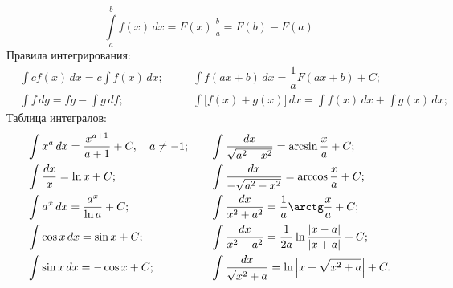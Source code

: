 \begin{equation}
	\int\limits^b_a f(x) \,d x = F(x) \biggr|^b_a = F(b) - F(a)
\end{equation}
Правила интегрирования:
\begin{align*}
	&\int c f(x) \,d x = c \int f(x) \,d x;\quad &&  \int f(ax + b) \,d x = \dfrac{1}{a}F(ax + b) + C;\\
	&\int f \,d g = fg - \int g \,d f; && \int \bigl[f(x) + g(x)\bigr] \,d x = \int f(x) \,d x + \int g(x) \,d x;
\end{align*}
Таблица интегралов:
\begin{align*}
	&\int  x^a \,d x = \dfrac{x^{a+1}}{a+1} + C,\quad a \neq -1; \quad
	&&\int \dfrac{dx}{\sqrt{a^2 - x^2}} = \arcsin\dfrac{x}{a} + C;\\
	&\int \frac{dx}{x} = \ln x + C;
	&&\int \dfrac{dx}{-\sqrt{a^2 - x^2}} = \arccos\dfrac{x}{a} + C;\\
	&\int a^x \,d x = \dfrac{a^x}{\ln a} + C;
	&&\int \dfrac{dx}{x^2 + a^2} = \dfrac{1}{a} \arctg \dfrac{x}{a} + C; \\
	&\int \cos x \,d x = \sin x + C;
	&&\int \dfrac{dx}{x^2 - a^2} = \dfrac{1}{2a} \ln \dfrac{|x - a|}{|x + a|} + C;\\
	&\int \sin x \,d x = -\cos x + C;
	&&\int \dfrac{dx}{\sqrt{x^2 + a}} = \ln \left| x + \sqrt{x^2 + a} \right| + C.
\end{align*}
